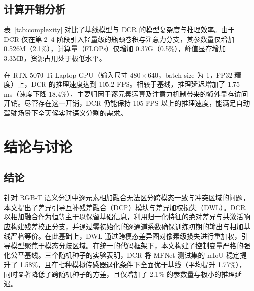 \documentclass[10pt,conference]{IEEEtran}
\begin{document}
\subsection{计算开销分析}

表~\ref{tab:complexity} 对比了基线模型与 DCR 的模型复杂度与推理效率。由于 DCR 仅在第 2–4 阶段引入轻量级的瓶颈卷积与注意力分支，其参数量仅增加 0.526M（2.1\%），计算量（FLOPs）仅增加 0.37G（0.5\%），峰值显存增加 3.3MB，资源占用处于极低水平。

在 RTX 5070 Ti Laptop GPU（输入尺寸 \(480\times640\)，batch size 为 1，FP32 精度）上，DCR 的推理速度达到 105.2 FPS。相较于基线，推理延迟增加了 1.75 ms（速度下降 18.4\%），主要归因于逐元素运算及注意力机制带来的额外显存访问开销。尽管存在这一开销，DCR 仍能保持 105 FPS 以上的推理速度，能满足自动驾驶场景下全天候实时语义分割的需求。


\begin{table}[t]
\centering
\caption{模型复杂度与推理效率对比（\(480\times640\)，batch size 1，FP32）。}
\label{tab:complexity}
\end{table}


\section{结论与讨论}

\subsection{结论}
针对 RGB-T 语义分割中逐元素相加融合无法区分跨模态一致与冲突区域的问题，本文提出了差异引导互补残差融合（DCR）模块与差异加权损失（DWL）。DCR 以相加融合作为恒等主干以保留基础信息，利用归一化特征的绝对差异与共激活响应构建残差校正分支，并通过零初始化的逐通道系数确保训练初期的输出与相加基线严格等价。在此基础上，DWL 通过跨模态差异图对像素级损失进行重加权，引导模型聚焦于模态分歧区域。在统一的代码框架下，本文构建了控制变量严格的强化公平基线。三个随机种子的实验表明，DCR 将 MFNet 测试集的 mIoU 稳定提升了 1.58\%，且在七种模拟传感器退化条件下全面优于基线（平均提升 1.77\%），同时显著降低了跨随机种子的方差，且仅增加了 2.1\% 的参数量与极小的推理延迟。
\end{document}
